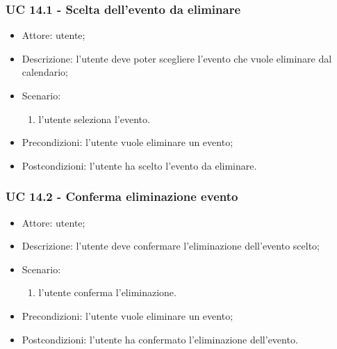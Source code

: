 \subsubsection{UC 14.1 - Scelta dell'evento da eliminare} \label{sec: UC 14.1}
\begin{itemize}
    \item Attore: utente;
    \item Descrizione: l'utente deve poter scegliere l'evento che vuole eliminare dal calendario;
    \item Scenario:
        \begin{enumerate}
        \item l'utente seleziona l'evento.
        \end{enumerate}
    
    \item Precondizioni: l'utente vuole eliminare un evento;
    \item Postcondizioni: l'utente ha scelto l'evento da eliminare.
\end{itemize}


\subsubsection{UC 14.2 - Conferma eliminazione evento} \label{sec: UC 14.2}
\begin{itemize}
    \item Attore: utente;
    \item Descrizione: l'utente deve confermare l'eliminazione dell'evento scelto;
    \item Scenario:
        \begin{enumerate}
        \item l'utente conferma l'eliminazione.
        \end{enumerate}
    
    \item Precondizioni: l'utente vuole eliminare un evento;
    \item Postcondizioni: l'utente ha confermato l'eliminazione dell'evento.
\end{itemize}


